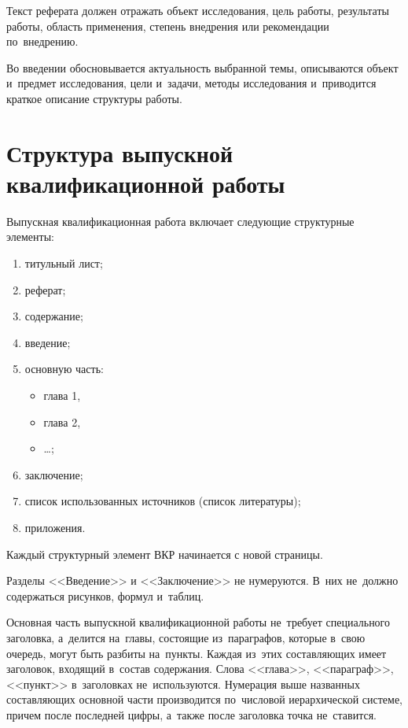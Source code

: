 \documentclass[a4paper,12pt]{diplom}
\begin{document}
Текст реферата должен отражать объект исследования, цель работы, результаты работы, область применения, степень внедрения или рекомендации по~внедрению.

\tableofcontents[Содержание]


Во введении обосновывается актуальность выбранной темы,
описываются объект и~предмет исследования, цели и~задачи, методы исследования и~приводится краткое описание структуры работы.

\chapter[Структура выпускной квалификационной работы]{Структура выпускной\\ квалификационной работы}

Выпускная квалификационная работа включает следующие структурные элементы:
\begin{enumerate}[label=\arabic{enumi})]
	\item титульный лист;
	\item реферат;
	\item содержание;
	\item введение;
	\item основную часть:
	\begin{itemize}
		\item глава 1,
		\item глава 2,
		\item \dots;
	\end{itemize}
	\item заключение;
	\item список использованных источников (список литературы);
	\item приложения.
\end{enumerate}
Каждый структурный элемент ВКР начинается с новой страницы.

Разделы <<Введение>> и <<Заключение>> не нумеруются. 
В~них не~должно содержаться рисунков, формул и~таблиц.

Основная часть выпускной квалификационной работы не~требует специального заголовка, а~делится на~главы, состоящие из~параграфов, которые в~свою очередь, могут быть разбиты на~пункты. Каждая из~этих составляющих имеет заголовок, входящий в~состав содержания. Слова <<глава>>, <<параграф>>, <<пункт>> в~заголовках не~используются.  
Нумерация выше названных составляющих основной части производится по~числовой иерархической системе, причем после последней цифры, а~также после заголовка точка не~ставится.
\end{document}
